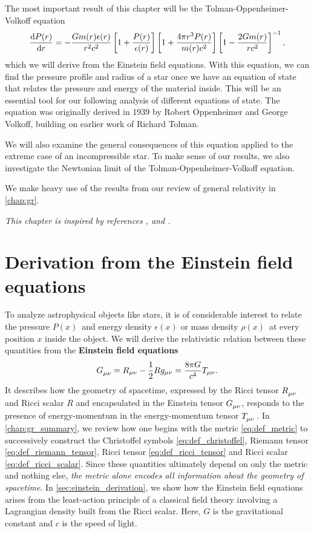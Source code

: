 The most important result of this chapter will be the Tolman-Oppenheimer-Volkoff equation
\begin{equation*}
	\odv{P(r)}{r} = -\frac{G m(r) \epsilon(r)}{r^2 c^2} \left[ 1 + \frac{P(r)}{\epsilon(r)} \right] \left[ 1 + \frac{4 \pi r^3 P(r)}{m(r) c^2} \right] \left[ 1 - \frac{2 G m(r)}{r c^2} \right]^{-1} ,
\end{equation*}
which we will derive from the Einstein field equations.
With this equation, we can find the pressure profile and radius of a star once we have an equation of state that relates the pressure and energy of the material inside.
This will be an essential tool for our following analysis of different equations of state.
The equation was originally derived in 1939 by Robert Oppenheimer and George Volkoff, building on earlier work of Richard Tolman. \cite{ref:tov,ref:tolman}

We will also examine the general consequences of this equation applied to the extreme case of an incompressible star. 
To make sense of our results, we also investigate the Newtonian limit of the Tolman-Oppenheimer-Volkoff equation.

We make heavy use of the results from our review of general relativity in \cref{chap:gr}.

\textit{This chapter is inspired by references \cite{ref:carroll}, \cite{ref:mtw} and \cite{ref:mika_gr_notes}.}

\section{Derivation from the Einstein field equations}
\label{sec:einstein_to_tov}

To analyze astrophysical objects like stars, it is of considerable interest to relate the pressure $P(x)$ and energy density $\epsilon(x)$ or mass density $\rho(x)$ at every position $x$ inside the object.
We will derive the relativistic relation between these quantities from the \textbf{Einstein field equations} %
\begin{equation}
	G\indices{_\mu_\nu} = R_{\mu \nu} - \frac{1}{2} R g_{\mu \nu} = \frac{8 \pi G}{c^4} T_{\mu \nu} .
	\label{eq:einstein}
\end{equation}
It describes how the geometry of spacetime, expressed by the Ricci tensor $R\indices{_\mu_\nu}$ and Ricci scalar $R$ and encapsulated in the Einstein tensor $G\indices{_\mu_\nu}$, responds to the presence of energy-momentum in the energy-momentum tensor $T\indices{_\mu_\nu}$.
In \cref{chap:gr_summary}, we review how one begins with the metric \eqref{eq:def_metric} to successively construct the Christoffel symbols \eqref{eq:def_christoffel}, Riemann tensor \eqref{eq:def_riemann_tensor}, Ricci tensor \eqref{eq:def_ricci_tensor} and Ricci scalar \eqref{eq:def_ricci_scalar}.
Since these quantities ultimately depend on only the metric and nothing else, \emph{the metric alone encodes all information about the geometry of spacetime}.
In \cref{sec:einstein_derivation}, we show how the Einstein field equations arises from the least-action principle of a classical field theory involving a Lagrangian density built from the Ricci scalar.
Here, $G$ is the gravitational constant and $c$ is the speed of light.

